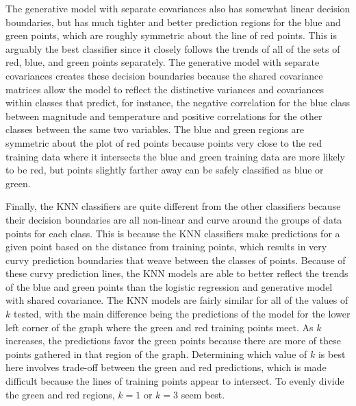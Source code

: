 \documentclass[submit]{harvardml}
\begin{document}
\begin{enumerate}
		The generative model with separate covariances also has somewhat linear decision boundaries, but has much tighter and better prediction regions for the blue and green points, which are roughly symmetric about the line of red points. This is arguably the best classifier since it closely follows the trends of all of the sets of red, blue, and green points separately. The generative model with separate covariances creates these decision boundaries because the shared covariance matrices allow the model to reflect the distinctive variances and covariances within classes that predict, for instance, the negative correlation for the blue class between magnitude and temperature and positive correlations for the other classes between the same two variables. The blue and green regions are symmetric about the plot of red points because points very close to the red training data where it intersects the blue and green training data are more likely to be red, but points slightly farther away can be safely classified as blue or green.
		
		Finally, the KNN classifiers are quite different from the other classifiers because their decision boundaries are all non-linear and curve around the groups of data points for each class. This is because the KNN classifiers make predictions for a given point based on the distance from training points, which results in very curvy prediction boundaries that weave between the classes of points. Because of these curvy prediction lines, the KNN models are able to better reflect the trends of the blue and green points than the logistic regression and generative model with shared covariance. The KNN models are fairly similar for all of the values of $k$ tested, with the main difference being the predictions of the model for the lower left corner of the graph where the green and red training points meet. As $k$ increases, the predictions favor the green points because there are more of these points gathered in that region of the graph. Determining which value of $k$ is best here involves trade-off between the green and red predictions, which is made difficult because the lines of training points appear to intersect. To evenly divide the green and red regions, $k=1$ or $k=3$ seem best.
	

\end{enumerate}
\end{document}
